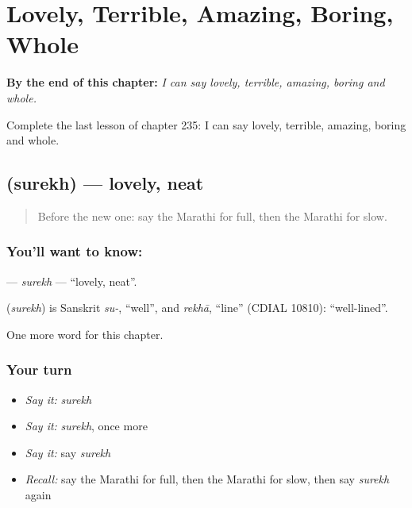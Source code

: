 
\chapter{Lovely, Terrible, Amazing, Boring, Whole}
\label{ch:mr-lovely-terrible-amazing-boring-whole}

\begin{chapteropening}
\textbf{By the end of this chapter:} \emph{I can say lovely, terrible, amazing, boring and whole.}

Complete the last lesson of chapter 235: I can say lovely, terrible, amazing, boring and whole.
\end{chapteropening}

\section[\texorpdfstring{\mr{सुरेख} (surekh)}{सुरेख (surekh)}]{ (surekh) — lovely, neat}

\label{lesson:MR-C235-surekh}



\begin{quote}
Before the new one: say the Marathi for full, then the Marathi for slow.
\end{quote}

\subsection*{You'll want to know: }
\textbf{} — \emph{surekh} — \textquotedblleft{}lovely, neat\textquotedblright{}.

\begin{cousinweb}
\textbf{} (\emph{surekh}) is Sanskrit \emph{su-}, \textquotedblleft{}well\textquotedblright{}, and \emph{rekhā}, \textquotedblleft{}line\textquotedblright{} (CDIAL 10810): \textquotedblleft{}well-lined\textquotedblright{}.
\end{cousinweb}

\begin{grammarlens}[title={What you've built}]
One more word for this chapter.
\end{grammarlens}

\subsection*{Your turn}
\begin{itemize}
\raggedright
  \item \emph{Say it:} \emph{surekh}
  \item \emph{Say it:} \emph{surekh}, once more
  \item \emph{Say it:} say \emph{surekh}
  \item \emph{Recall:} say the Marathi for full, then the Marathi for slow, then say \emph{surekh} again
\end{itemize}

